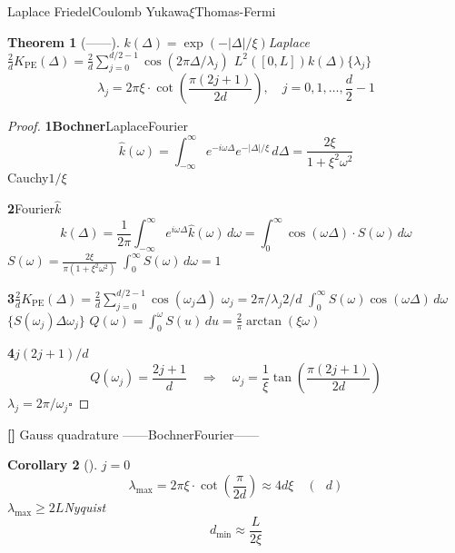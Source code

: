 \documentclass[11pt,a4paper]{article}
\newtheorem{theorem}{Theorem}[section]
\newtheorem{corollary}[theorem]{Corollary}
\theoremstyle{remark}
\DeclareMathOperator{\PE}{PE}
\newcommand{\rigorous}{\textnormal{\textbf{[]}}}
\begin{document}
Laplace
FriedelCoulomb
Yukawa$\xi$Thomas-Fermi

\begin{theorem}[——]
\label{thm:1.2.1}
$k(\Delta) = \exp(-|\Delta|/\xi)$Laplace
$\frac{2}{d}K_{\PE}(\Delta) = \frac{2}{d}\sum_{j=0}^{d/2-1} \cos(2\pi\Delta/\lambda_j)$
$L^2([0, L])$$k(\Delta)$$\{\lambda_j\}$
\begin{equation}
    \boxed{
    \lambda_j = 2\pi\xi \cdot \cot\!\left(\frac{\pi(2j+1)}{2d}\right),\quad
    j = 0, 1, \ldots, \frac{d}{2}-1
    }
\end{equation}
\end{theorem}

\begin{proof}
\textbf{1Bochner}LaplaceFourier
\begin{equation}
    \hat{k}(\omega) = \int_{-\infty}^{\infty} e^{-i\omega\Delta} e^{-|\Delta|/\xi}\,d\Delta
    = \frac{2\xi}{1 + \xi^2\omega^2}
\end{equation}
Cauchy$1/\xi$

\textbf{2}Fourier$\hat{k}$
\begin{equation}
    k(\Delta) = \frac{1}{2\pi}\int_{-\infty}^{\infty} e^{i\omega\Delta}\hat{k}(\omega)\,d\omega
    = \int_{0}^{\infty} \cos(\omega\Delta) \cdot S(\omega)\,d\omega
\end{equation}
$S(\omega) = \frac{2\xi}{\pi(1 + \xi^2\omega^2)}$
$\int_0^{\infty} S(\omega)\,d\omega = 1$

\textbf{3}$\frac{2}{d}K_{\PE}(\Delta) = \frac{2}{d}\sum_{j=0}^{d/2-1} \cos(\omega_j \Delta)$
$\omega_j = 2\pi/\lambda_j$\textbf{}$2/d$
$\int_0^{\infty} S(\omega)\cos(\omega\Delta)\,d\omega$
$\{S(\omega_j)\Delta\omega_j\}$
$Q(\omega) = \int_0^{\omega} S(u)\,du = \frac{2}{\pi}\arctan(\xi\omega)$
\textbf{}

\textbf{4}$j$$(2j+1)/d$
\begin{equation}
    Q(\omega_j) = \frac{2j+1}{d} \quad\Longrightarrow\quad
    \omega_j = \frac{1}{\xi}\tan\!\left(\frac{\pi(2j+1)}{2d}\right)
\end{equation}
$\lambda_j = 2\pi/\omega_j$\hfill $\square$
\end{proof}

\rigorous{} \textbf{}Gauss quadrature
——BochnerFourier——


\begin{corollary}[]
\label{cor:1.2.1}
$j=0$
\begin{equation}
    \lambda_{\max} = 2\pi\xi \cdot \cot\!\left(\frac{\pi}{2d}\right)
    \approx 4d\xi \quad (\text{ } d)
\end{equation}
$\lambda_{\max} \geq 2L$Nyquist
\begin{equation}
    \boxed{d_{\min} \approx \frac{L}{2\xi}}
\end{equation}
\end{corollary}
\end{document}
